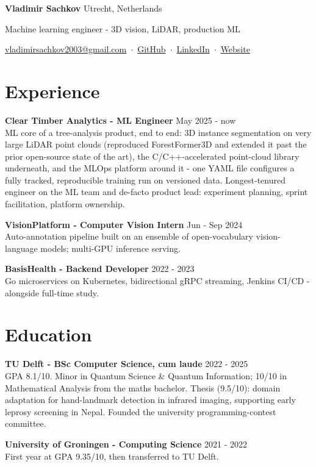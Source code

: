 \documentclass[10pt]{article}
\newcommand{\entry}[3]{%
  \textbf{#1} \hfill {\small\color{gray!90!black}#2}\\
  #3\par\vspace{4pt}}
\begin{document}
{\LARGE\bfseries Vladimir Sachkov}\hfill
{\small Utrecht, Netherlands}

\vspace{2pt}
Machine learning engineer - 3D vision, LiDAR, production ML

\vspace{1pt}
{\small
  \href{mailto:vladimirsachkov2003@gmail.com}{vladimirsachkov2003@gmail.com} \,$\cdot$\,
  \href{https://github.com/EraChanZ}{GitHub} \,$\cdot$\,
  \href{https://www.linkedin.com/in/vladimir-sachkov-a3ba2b243}{LinkedIn} \,$\cdot$\,
  \href{https://erachanzzz.github.io/VladimirSachkov/}{Website}}

\section{Experience}

\entry{Clear Timber Analytics - ML Engineer}{May 2025 - now}
{ML core of a tree-analysis product, end to end: 3D instance segmentation on very large
LiDAR point clouds (reproduced ForestFormer3D and extended it past the prior open-source
state of the art), the C/C++-accelerated point-cloud library underneath, and the MLOps
platform around it - one YAML file configures a fully tracked, reproducible training run
on versioned data. Longest-tenured engineer on the ML team and de-facto product lead:
experiment planning, sprint facilitation, platform ownership.}

\entry{VisionPlatform - Computer Vision Intern}{Jun - Sep 2024}
{Auto-annotation pipeline built on an ensemble of open-vocabulary vision-language models;
multi-GPU inference serving.}

\entry{BasisHealth - Backend Developer}{2022 - 2023}
{Go microservices on Kubernetes, bidirectional gRPC streaming, Jenkins CI/CD -
alongside full-time study.}

\section{Education}

\entry{TU Delft - BSc Computer Science, cum laude}{2022 - 2025}
{GPA 8.1/10. Minor in Quantum Science \& Quantum Information; 10/10 in Mathematical
Analysis from the maths bachelor. Thesis (9.5/10): domain adaptation for hand-landmark
detection in infrared imaging, supporting early leprosy screening in Nepal. Founded the
university programming-contest committee.}

\entry{University of Groningen - Computing Science}{2021 - 2022}
{First year at GPA 9.35/10, then transferred to TU Delft.}
\end{document}
